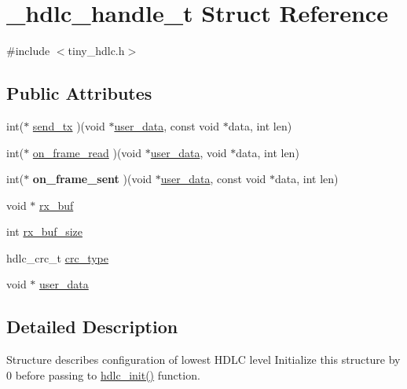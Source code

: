 \hypertarget{struct__hdlc__handle__t}{}\section{\+\_\+hdlc\+\_\+handle\+\_\+t Struct Reference}
\label{struct__hdlc__handle__t}


{\ttfamily \#include $<$tiny\+\_\+hdlc.\+h$>$}

\subsection*{Public Attributes}
\begin{DoxyCompactItemize}
\item 
int($\ast$ \hyperlink{struct__hdlc__handle__t_ac25841a53be120a8a50b99b73e7e8a8f}{send\+\_\+tx} )(void $\ast$\hyperlink{struct__hdlc__handle__t_a41563ee7b01240a582d2f9ce9a632da8}{user\+\_\+data}, const void $\ast$data, int len)
\item 
int($\ast$ \hyperlink{struct__hdlc__handle__t_a751872adfef39b5b1325fa8826bae689}{on\+\_\+frame\+\_\+read} )(void $\ast$\hyperlink{struct__hdlc__handle__t_a41563ee7b01240a582d2f9ce9a632da8}{user\+\_\+data}, void $\ast$data, int len)
\item 
\mbox{\label{struct__hdlc__handle__t_a9aba360df83395af01ff448bca03e259}} 
int($\ast$ {\bfseries on\+\_\+frame\+\_\+sent} )(void $\ast$\hyperlink{struct__hdlc__handle__t_a41563ee7b01240a582d2f9ce9a632da8}{user\+\_\+data}, const void $\ast$data, int len)
\item 
void $\ast$ \hyperlink{struct__hdlc__handle__t_a4736ab7a858df79cf74bd19e6dbacb13}{rx\+\_\+buf}
\item 
int \hyperlink{struct__hdlc__handle__t_a40baccf093b26c08d9108c8238f95675}{rx\+\_\+buf\+\_\+size}
\item 
hdlc\+\_\+crc\+\_\+t \hyperlink{struct__hdlc__handle__t_a156f67a5da24e537a8c0dcda28b59668}{crc\+\_\+type}
\item 
void $\ast$ \hyperlink{struct__hdlc__handle__t_a41563ee7b01240a582d2f9ce9a632da8}{user\+\_\+data}
\end{DoxyCompactItemize}


\subsection{Detailed Description}
Structure describes configuration of lowest H\+D\+LC level Initialize this structure by 0 before passing to \hyperlink{group__HDLC__API_gaa41c388433273a76460ddfbaff0f8f5d}{hdlc\+\_\+init()} function. 

